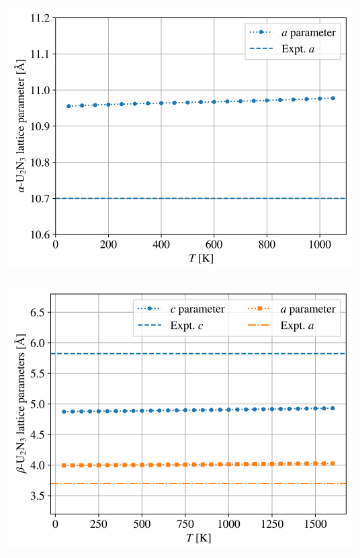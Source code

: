 \documentclass[preprint, 12pt]{elsarticle}
\begin{document}
\begin{figure}[h!]
\centering
\begin{subfigure}{0.45\textwidth}
    \includegraphics[width=\textwidth]{aU2N3.png}
    \caption{}
    \label{Fig:aU2N3}
\end{subfigure}
\hfill
\begin{subfigure}{0.45\textwidth}
    \includegraphics[width=\textwidth]{bU2N3.png}
    \caption{}
    \label{Fig:bU2N3}
\end{subfigure}
\hfill
\begin{subfigure}{0.45\textwidth}

\end{subfigure}
\end{figure}
\end{document}
